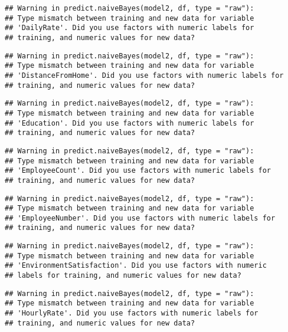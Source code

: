 \documentclass[
]{article}
\begin{document}
\begin{verbatim}
## Warning in predict.naiveBayes(model2, df, type = "raw"):
## Type mismatch between training and new data for variable
## 'DailyRate'. Did you use factors with numeric labels for
## training, and numeric values for new data?
\end{verbatim}

\begin{verbatim}
## Warning in predict.naiveBayes(model2, df, type = "raw"):
## Type mismatch between training and new data for variable
## 'DistanceFromHome'. Did you use factors with numeric labels for
## training, and numeric values for new data?
\end{verbatim}

\begin{verbatim}
## Warning in predict.naiveBayes(model2, df, type = "raw"):
## Type mismatch between training and new data for variable
## 'Education'. Did you use factors with numeric labels for
## training, and numeric values for new data?
\end{verbatim}

\begin{verbatim}
## Warning in predict.naiveBayes(model2, df, type = "raw"):
## Type mismatch between training and new data for variable
## 'EmployeeCount'. Did you use factors with numeric labels for
## training, and numeric values for new data?
\end{verbatim}

\begin{verbatim}
## Warning in predict.naiveBayes(model2, df, type = "raw"):
## Type mismatch between training and new data for variable
## 'EmployeeNumber'. Did you use factors with numeric labels for
## training, and numeric values for new data?
\end{verbatim}

\begin{verbatim}
## Warning in predict.naiveBayes(model2, df, type = "raw"):
## Type mismatch between training and new data for variable
## 'EnvironmentSatisfaction'. Did you use factors with numeric
## labels for training, and numeric values for new data?
\end{verbatim}

\begin{verbatim}
## Warning in predict.naiveBayes(model2, df, type = "raw"):
## Type mismatch between training and new data for variable
## 'HourlyRate'. Did you use factors with numeric labels for
## training, and numeric values for new data?
\end{verbatim}
\end{document}
